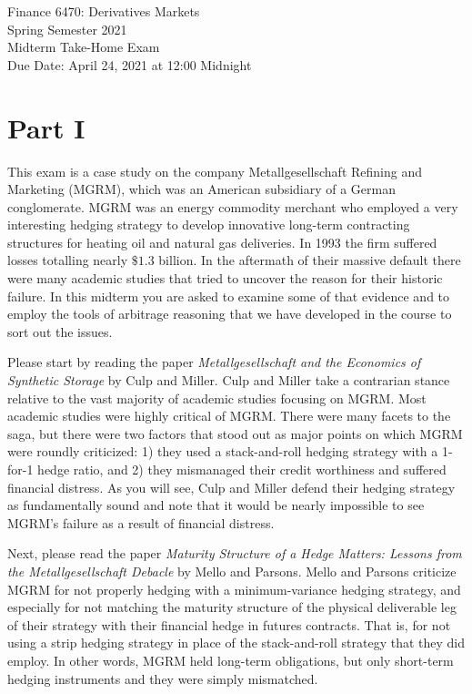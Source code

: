 \documentclass[12pt]{article}
\begin{document}
Finance 6470: Derivatives Markets           \\
Spring Semester 2021                        \\
Midterm Take-Home Exam                      \\
Due Date: April 24, 2021 at 12:00 Midnight  \\

\vspace{15mm}

\section*{Part I}

This exam is a case study on the company Metallgesellschaft Refining and Marketing (MGRM), which was an American subsidiary of a
German conglomerate. MGRM was an energy commodity merchant who employed a very interesting hedging strategy to develop innovative
long-term contracting structures for heating oil and natural gas deliveries. In 1993 the firm suffered losses totalling nearly 
$\$1.3$ billion. In the aftermath of their massive default there were many academic studies that tried to uncover the reason for their 
historic failure. In this midterm you are asked to examine some of that evidence and to employ the tools of arbitrage reasoning that we
have developed in the course to sort out the issues.

\vspace{10mm}

Please start by reading the paper \textit{Metallgesellschaft and the Economics of Synthetic Storage} by Culp and Miller. Culp and Miller
take a contrarian stance relative to the vast majority of academic studies focusing on MGRM. Most academic studies were highly critical of
MGRM. There were many facets to the saga, but there were two factors that stood out as major points on which MGRM were roundly criticized: 
1) they used a stack-and-roll hedging strategy with a 1-for-1 hedge ratio, and 2) they mismanaged their credit worthiness and suffered
financial distress. As you will see, Culp and Miller defend their hedging strategy as fundamentally sound and note that it would be nearly
impossible to see MGRM's failure as a result of financial distress. 

\vspace{10mm}

Next, please read the paper \textit{Maturity Structure of a Hedge Matters: Lessons from the Metallgesellschaft Debacle} by Mello and Parsons.
Mello and Parsons criticize MGRM for not properly hedging with a minimum-variance hedging strategy, and especially for not matching the maturity
structure of the physical deliverable leg of their strategy with their financial hedge in futures contracts. That is, for not using a strip 
hedging strategy in place of the stack-and-roll strategy that they did employ. In other words, MGRM held long-term obligations, but only short-term
hedging instruments and they were simply mismatched.
\end{document}
